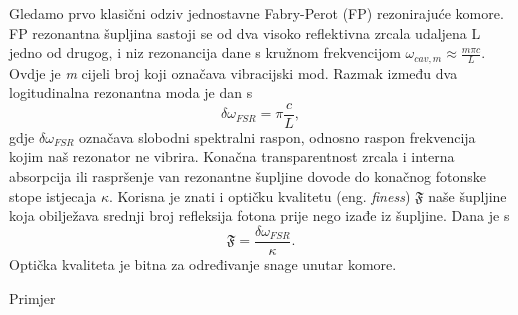 Gledamo prvo klasični odziv jednostavne Fabry-Perot (FP) rezonirajuće komore. FP rezonantna šupljina sastoji se od dva visoko reflektivna
zrcala udaljena L jedno od drugog, i niz rezonancija dane s kružnom frekvencijom $\omega_{cav,m} \approx \frac{m\pi c}{L}$. Ovdje je \textit{m} cijeli broj koji označava
vibracijski mod. Razmak između dva logitudinalna rezonantna moda je dan s
\begin{equation}
	\delta\omega_{FSR} = \pi \frac{c}{L},
\end{equation}
gdje $\delta \omega_{FSR}$ označava slobodni spektralni raspon, odnosno raspon frekvencija kojim naš rezonator ne vibrira. Konačna transparentnost zrcala i
interna absorpcija ili raspršenje van rezonantne šupljine dovode do konačnog fotonske stope istjecaja $\kappa$. 
Korisna je znati i optičku kvalitetu (eng. \textit{finess}) $\mathfrak{F}$ naše šupljine koja obilježava srednji broj refleksija fotona prije nego izađe iz šupljine. Dana je s 
\begin{equation}
	\mathfrak{F} = \frac{\delta\omega_{FSR}}{\kappa}.
\end{equation}
Optička kvaliteta je bitna za određivanje snage unutar komore.
\begin{exampleblock}{Primjer}

	
\end{exampleblock}
